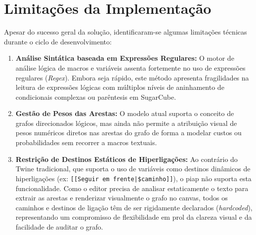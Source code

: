 \section{Limitações da Implementação}
Apesar do sucesso geral da solução, identificaram-se algumas limitações técnicas durante o ciclo de desenvolvimento:
\begin{enumerate}
    \item \textbf{Análise Sintática baseada em Expressões Regulares:} O motor de análise lógica de macros e variáveis assenta fortemente no uso de expressões regulares (\textit{Regex}). Embora seja rápido, este método apresenta fragilidades na leitura de expressões lógicas com múltiplos níveis de aninhamento de condicionais complexas ou parêntesis em SugarCube.
    \item \textbf{Gestão de Pesos das Arestas:} O modelo atual suporta o conceito de grafos direcionados lógicos, mas ainda não permite a atribuição visual de pesos numéricos diretos nas arestas do grafo de forma a modelar custos ou probabilidades sem recorrer a macros textuais.
    \item \textbf{Restrição de Destinos Estáticos de Hiperligações:} Ao contrário do Twine tradicional, que suporta o uso de variáveis como destinos dinâmicos de hiperligações (ex: \texttt{[[Seguir em frente|\$caminho]]}), o \gls{piap} não suporta esta funcionalidade. Como o editor precisa de analisar estaticamente o texto para extrair as arestas e renderizar visualmente o grafo no canvas, todos os caminhos e destinos de ligação têm de ser rigidamente declarados (\textit{hardcoded}), representando um compromisso de flexibilidade em prol da clareza visual e da facilidade de auditar o grafo.
\end{enumerate}

